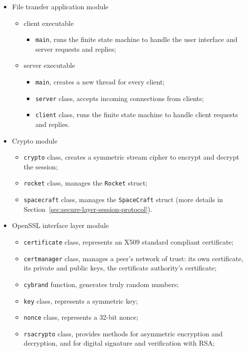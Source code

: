 \documentclass[a4paper,12pt]{article}
\begin{document}
\begin{itemize}
  \item File transfer application module
  \begin{itemize}
    \item client executable
    \begin{itemize}
      \item \texttt{main}, runs the finite state machine to handle the user interface and server requests and replies;
    \end{itemize}
    \item server executable
    \begin{itemize}
      \item \texttt{main}, creates a new thread for every client;
      \item \texttt{server} class, accepts incoming connections from clients;
      \item \texttt{client} class, runs the finite state machine to handle client requests and replies.
    \end{itemize}
  \end{itemize}
  \item Crypto module
  \begin{itemize}
    \item \texttt{crypto} class, creates a symmetric stream cipher to encrypt and decrypt the session;
    \item \texttt{rocket} class, manages the \texttt{Rocket} struct;
    \item \texttt{spacecraft} class, manages the \texttt{SpaceCraft} struct (more details in Section~\ref{sec:secure-layer-session-protocol}).
  \end{itemize}
  \item OpenSSL interface layer module
  \begin{itemize}
    \item \texttt{certificate} class, represents an X509 standard compliant certificate;
    \item \texttt{certmanager} class, manages a peer's network of trust: its own certificate, its private and public keys, the certificate authority's certificate;
    \item \texttt{cybrand} function, generates truly random numbers;
    \item \texttt{key} class, represents a symmetric key;
    \item \texttt{nonce} class, represents a 32-bit nonce;
    \item \texttt{rsacrypto} class, provides methods for asymmetric encryption and decryption, and for digital signature and verification with RSA;

\end{itemize}
\end{itemize}
\end{document}

